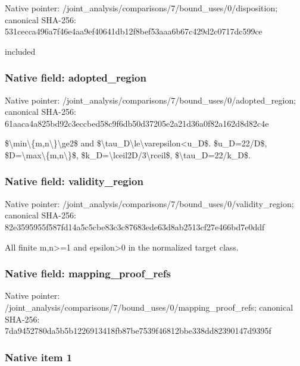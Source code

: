 \documentclass[10pt,a4paper]{article}
\begin{document}
Native pointer: /joint\_analysis/comparis\allowbreak{}ons/7/bound\_uses/0/dispo\allowbreak{}sition; canonical SHA-256: 531cecca496a7f46e4aa9ef4\allowbreak{}0641db12f8bef53aaa6b67c4\allowbreak{}29d2c0717dc599ce


included


\subsubsection{Native field: adopted\_region}


Native pointer: /joint\_analysis/comparis\allowbreak{}ons/7/bound\_uses/0/adopt\allowbreak{}ed\_region; canonical SHA-256: 61aaca4a825bd92c3eccbed5\allowbreak{}8c9f6db50d37205e2a21d36a\allowbreak{}0f82a162d8d82c4e


\$\textbackslash{}min\textbackslash{}\{m,n\textbackslash{}\}\textbackslash{}ge2\$ and \$\textbackslash{}tau\_D\textbackslash{}le\textbackslash{}varepsilon<u\_D\$. \$u\_D=22/D\$, \$D=\textbackslash{}max\textbackslash{}\{m,n\textbackslash{}\}\$, \$k\_D=\textbackslash{}lceil2D/3\textbackslash{}rceil\$, \$\textbackslash{}tau\_D=22/k\_D\$.


\subsubsection{Native field: validity\_region}


Native pointer: /joint\_analysis/comparis\allowbreak{}ons/7/bound\_uses/0/valid\allowbreak{}ity\_region; canonical SHA-256: 82e3595955f587fd14a5c5cb\allowbreak{}e83c3c87683ede63d8ab2513\allowbreak{}cf27e466bd7e0ddf


All finite m,n>=1 and epsilon>0 in the normalized target class.


\subsubsection{Native field: mapping\_proof\_refs}


Native pointer: /joint\_analysis/comparis\allowbreak{}ons/7/bound\_uses/0/mappi\allowbreak{}ng\_proof\_refs; canonical SHA-256: 7da9452780da5b5b12269134\allowbreak{}18fb87be7539f46812bbe338\allowbreak{}dd82390147d9395f



\subsubsection{Native item 1}
\end{document}
